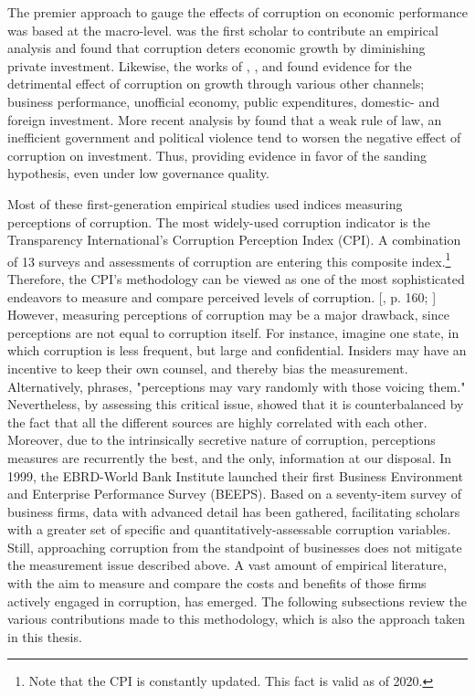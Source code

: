 The premier approach to gauge the effects of corruption on economic performance was based at the macro-level. \citet[p. 683]{mauro1995corruption} was the first scholar to contribute an empirical analysis and found that corruption deters economic growth by diminishing private investment. Likewise, the works of \citet{hines1995forbidden}, \citet{johnson1999corruption}, \citet{tanzi1998corruption} and \citet{wei2000taxing} found evidence for the detrimental effect of corruption on growth through various other channels; business performance, unofficial economy, public expenditures, domestic- and foreign investment. \citep[pp. 2--3]{kaufmann1999does} More recent analysis by \citet[p. 91]{meon2005does} found that a weak rule of law, an inefficient government and political violence tend to worsen the negative effect of corruption on investment. Thus, providing evidence in favor of the sanding hypothesis, even under low governance quality.

Most of these first-generation empirical studies used indices measuring perceptions of corruption. The most widely-used corruption indicator is the Transparency International's Corruption Perception Index (CPI). A combination of 13 surveys and assessments of corruption are entering this composite index.\footnote{Note that the CPI is constantly updated. This fact is valid as of 2020.} Therefore, the CPI's methodology can be viewed as one of the most sophisticated endeavors to measure and compare perceived levels of corruption. [\citealp{johnston2001measuring}, p. 160; \citealp{transparency}] However, measuring perceptions of corruption may be a major drawback, since perceptions are not equal to corruption itself. For instance, imagine one state, in which corruption is less frequent, but large and confidential. Insiders may have an incentive to keep their own counsel, and thereby bias the measurement. \citep[p. 164--164]{johnston2001measuring}
Alternatively, \citet[p. 90]{lambsdorff1998corruption} phrases, "perceptions may vary randomly with those voicing them." Nevertheless, by assessing this critical issue, \citet[p. 99]{lambsdorff1998corruption} showed that it is counterbalanced by the fact that all the different sources are highly correlated with each other. Moreover, due to the intrinsically secretive nature of corruption, perceptions measures are recurrently the best, and the only, information at our disposal. \citep[p. 2]{kaufmann2007measuring} In 1999, the EBRD-World Bank Institute launched their first Business Environment and Enterprise Performance Survey (BEEPS). Based on a seventy-item survey of business firms, data with advanced detail has been gathered, facilitating scholars with a greater set of specific and quantitatively-assessable corruption variables. Still, approaching corruption from the standpoint of businesses does not mitigate the measurement issue described above. \citep[pp. 168--169]{johnston2001measuring} A vast amount of empirical literature, with the aim to measure and  compare the costs and benefits of those firms actively engaged in corruption, has emerged. \citep[p. 19]{hellman2000seize} The following subsections review the various contributions made to this methodology, which is also the approach taken in this thesis. 

